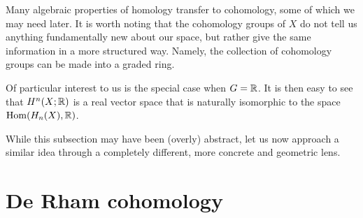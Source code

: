 \documentclass[a4paper, 12pt]{article}
\begin{document}
Many algebraic properties of homology transfer to cohomology, some of which we may need later.
It is worth noting that the cohomology groups of $X$ do not tell us anything fundamentally new about our space,
but rather give the same information in a more structured way.
Namely, the collection of cohomology groups can be made into a graded ring.

Of particular interest to us is the special case when $G = \mathbb{R}$.
It is then easy to see that $H^n(X; \mathbb{R})$ is a real vector space that is naturally isomorphic to the space $\operatorname{Hom}(H_n(X), \mathbb{R})$.

While this subsection may have been (overly) abstract, let us now approach a similar idea through a completely different, more concrete and geometric lens.

\section{De Rham cohomology}
\end{document}
